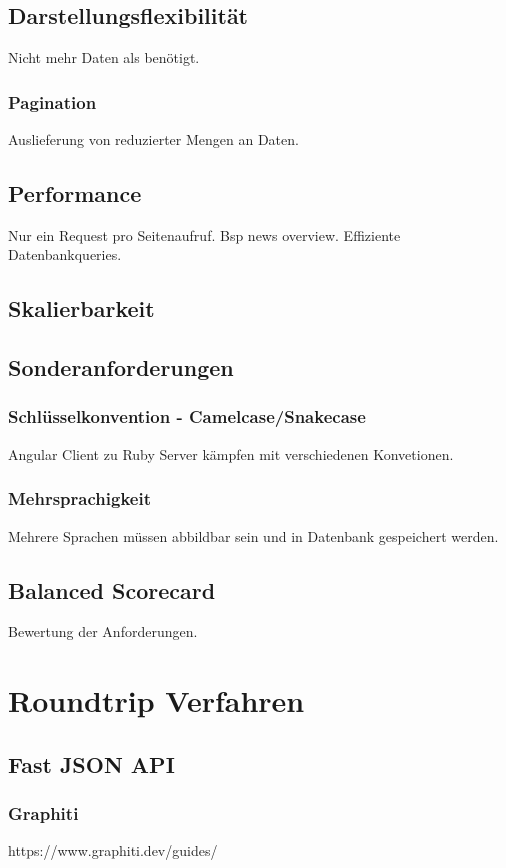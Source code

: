 \section{Darstellungsflexibilität}
Nicht mehr Daten als benötigt.
\subsection{Pagination}
Auslieferung von reduzierter Mengen an Daten.

\section{Performance}
Nur ein Request pro Seitenaufruf. Bsp news overview. Effiziente Datenbankqueries.

\section{Skalierbarkeit}

\section{Sonderanforderungen}
\subsection{Schlüsselkonvention - Camelcase/Snakecase}
Angular Client zu Ruby Server kämpfen mit verschiedenen Konvetionen.
\subsection{Mehrsprachigkeit}
Mehrere Sprachen müssen abbildbar sein und in Datenbank gespeichert werden.
\section{Balanced Scorecard}
Bewertung der Anforderungen.
\chapter{Roundtrip Verfahren}

\section{Fast JSON API}
\subsection{Graphiti}
https://www.graphiti.dev/guides/
